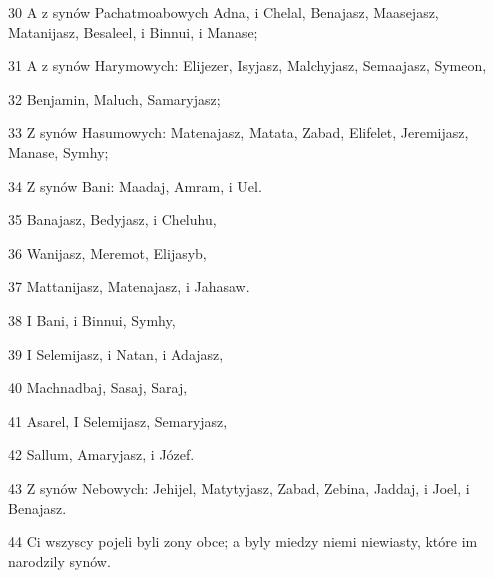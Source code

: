 \par 30 A z synów Pachatmoabowych Adna, i Chelal, Benajasz, Maasejasz, Matanijasz, Besaleel, i Binnui, i Manase;
\par 31 A z synów Harymowych: Elijezer, Isyjasz, Malchyjasz, Semaajasz, Symeon,
\par 32 Benjamin, Maluch, Samaryjasz;
\par 33 Z synów Hasumowych: Matenajasz, Matata, Zabad, Elifelet, Jeremijasz, Manase, Symhy;
\par 34 Z synów Bani: Maadaj, Amram, i Uel.
\par 35 Banajasz, Bedyjasz, i Cheluhu,
\par 36 Wanijasz, Meremot, Elijasyb,
\par 37 Mattanijasz, Matenajasz, i Jahasaw.
\par 38 I Bani, i Binnui, Symhy,
\par 39 I Selemijasz, i Natan, i Adajasz,
\par 40 Machnadbaj, Sasaj, Saraj,
\par 41 Asarel, I Selemijasz, Semaryjasz,
\par 42 Sallum, Amaryjasz, i Józef.
\par 43 Z synów Nebowych: Jehijel, Matytyjasz, Zabad, Zebina, Jaddaj, i Joel, i Benajasz.
\par 44 Ci wszyscy pojeli byli zony obce; a byly miedzy niemi niewiasty, które im narodzily synów.


